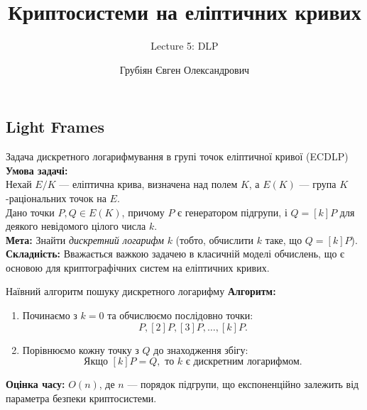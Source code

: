 \documentclass[9pt]{beamer}
\title{Криптосистеми на еліптичних кривих} %
\subtitle{Lecture 5: DLP}
\author{Грубіян Євген Олександрович}
\begin{document}
  \frame{\maketitle}


  \begin{darkframes}
      
    \section{Light Frames}


\begin{frame}{Задача дискретного логарифмування в групі точок еліптичної кривої (ECDLP)}
  \textbf{Умова задачі:}\\[2mm]
  Нехай \(E/K\) --- еліптична крива, визначена над полем \(K\), а \(E(K)\) --- група \(K\)-раціональних точок на \(E\).\\[1mm]
  Дано точки \(P, Q \in E(K)\), причому \(P\) є генератором підгрупи, і \(Q = [k]P\) для деякого невідомого цілого числа \(k\).\\[1mm]
  \textbf{Мета:} Знайти \emph{дискретний логарифм} \(k\) (тобто, обчислити \(k\) таке, що \(Q = [k]P\)).\\[2mm]
  \textbf{Складність:} Вважається важкою задачею в класичній моделі обчислень, що є основою для криптографічних систем на еліптичних кривих.
\end{frame}

\begin{frame}{Наївний алгоритм пошуку дискретного логарифму}
  \textbf{Алгоритм:}  
  \begin{enumerate}
    \item Починаємо з \(k=0\) та обчислюємо послідовно точки:
      \[
      P, [2]P, [3]P, \dots, [k]P.
      \]
    \item Порівнюємо кожну точку з \(Q\) до знаходження збігу:
      \[
      \text{Якщо } [k]P = Q,\text{ то } k \text{ є дискретним логарифмом.}
      \]
  \end{enumerate}
  \vspace{0.3cm}
  \textbf{Оцінка часу:} \(O(n)\), де \(n\) --- порядок підгрупи, що експоненційно залежить від параметра безпеки криптосистеми.
\end{frame}


\end{darkframes}
\end{document}

